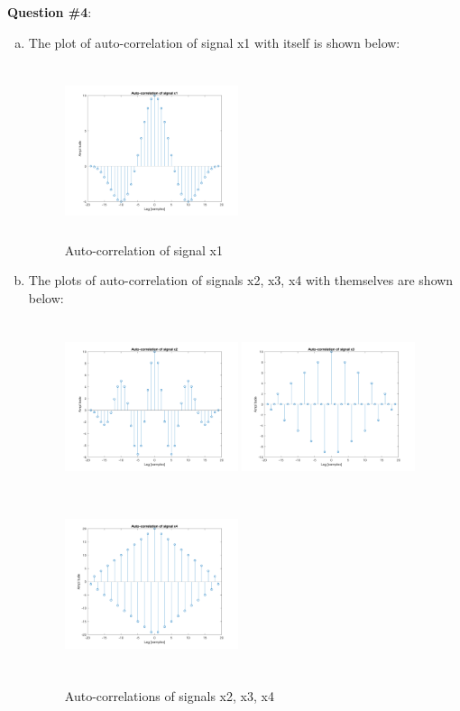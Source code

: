 \documentclass[a4paper]{article}
\begin{document}
\begin{spacing}{2.0}
\newpage
\Large\textbf{ Question \#4}:  \\
\normalsize
\begin{enumerate}[(a)]
\item The plot of auto-correlation of signal x1 with itself is shown below:
\begin{figure}[H]
\centering
\includegraphics[width=2in,height=2in]{autox1.png}
\caption{Auto-correlation of signal x1}
\label{fig:graph}
\end{figure}

\item The plots of auto-correlation of signals x2, x3, x4 with themselves are shown below:
\begin{figure}[H]
\centering
\includegraphics[width=2in,height=2in]{autox2.png}
\includegraphics[width=2in,height=2in]{autox3.png}
\includegraphics[width=2in,height=2in]{autox4.png}
\caption{Auto-correlations of signals x2, x3, x4}
\label{fig:graph}
\end{figure}


\end{enumerate}
\end{spacing}
\end{document}
